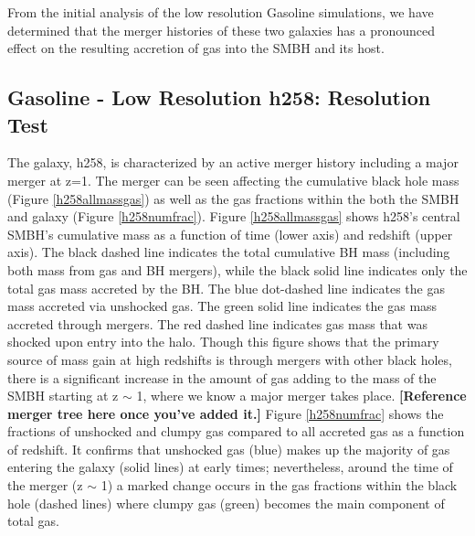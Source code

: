 \documentclass[manuscript]{aastex}
\begin{document}
From the initial analysis of the low resolution Gasoline simulations, we have determined that the merger histories of these two galaxies has a pronounced effect on the resulting accretion of gas into the SMBH and its host. 

\subsection{Gasoline - Low Resolution h258: Resolution Test}
	
The galaxy, h258, is characterized by an active merger history including a major merger at z=1. The merger can be seen affecting the cumulative black hole mass (Figure \ref{h258allmassgas}) as well as the gas fractions within the both the SMBH and galaxy (Figure \ref{h258numfrac}). 
Figure \ref{h258allmassgas} shows h258's central SMBH's cumulative mass as a function of time (lower axis) and redshift (upper axis). The black dashed line indicates the total cumulative BH mass (including both mass from gas and BH mergers), while the black solid line indicates only the total gas mass accreted by the BH. The blue dot-dashed line indicates the gas mass accreted via unshocked gas. The green solid line indicates the gas mass accreted through mergers. The red dashed line indicates gas mass that was shocked upon entry into the halo. Though this figure shows that the primary source of mass gain at high redshifts is through mergers with other black holes, there is a significant increase in the amount of gas adding to the mass of the SMBH starting at z $\sim$ 1, where we know a major merger takes place. \textbf{[Reference merger tree here once you've added it.]} Figure \ref{h258numfrac} shows the fractions of unshocked and clumpy gas compared to all accreted gas as a function of redshift. It confirms that unshocked gas (blue) makes up the majority of gas entering the galaxy (solid lines) at early times; nevertheless, around the time of the merger (z $\sim$ 1) a marked change occurs in the gas fractions within the black hole (dashed lines) where clumpy gas (green) becomes the main component of total gas. 
\end{document}
